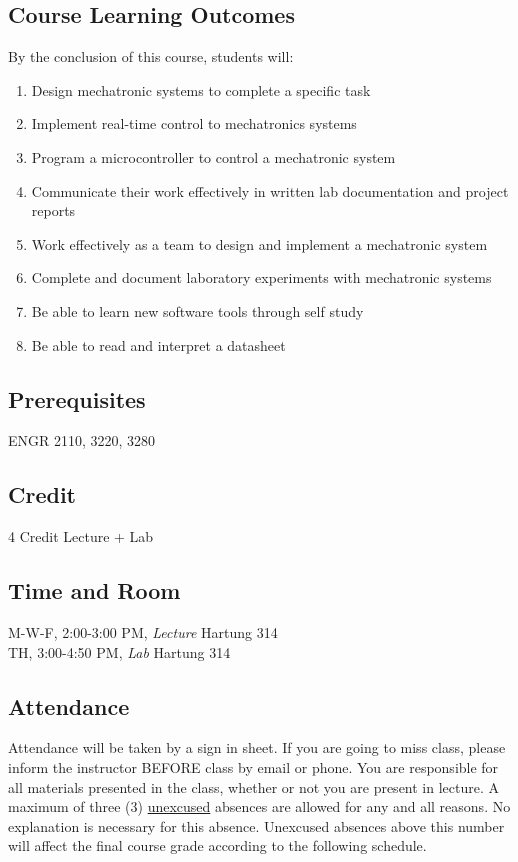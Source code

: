 \documentclass[12pt,letterpaper,onecolumn]{report}
\begin{document}
\subsection*{Course Learning Outcomes}
By the conclusion of this course, students will:
\begin{enumerate}
\item Design mechatronic systems to complete a specific task
\item Implement real-time control to mechatronics systems
\item Program a microcontroller to control a mechatronic system
\item Communicate their work effectively in written lab documentation and project reports
\item Work effectively as a team to design and implement a mechatronic system
\item Complete and document laboratory experiments with mechatronic systems
\item Be able to learn new software tools through self study
\item Be able to read and interpret a datasheet
\end{enumerate}

\subsection*{Prerequisites}
ENGR 2110, 3220, 3280

\subsection*{Credit}
4 Credit Lecture + Lab

\subsection*{Time and Room}
M-W-F, 2:00-3:00 PM, \textit{Lecture} Hartung 314\\
TH, 3:00-4:50 PM, \textit{Lab} Hartung 314

\subsection*{Attendance}
Attendance will be taken by a sign in sheet. If you are going to miss class, please inform the instructor BEFORE class by email or phone. You are responsible for all materials presented in the class, whether or not you are present in lecture. A maximum of three (3) \underline{unexcused} absences are allowed for any and all reasons. No explanation is necessary for this absence. Unexcused absences above this number will affect the final course grade according to the following schedule.\\
\end{document}
